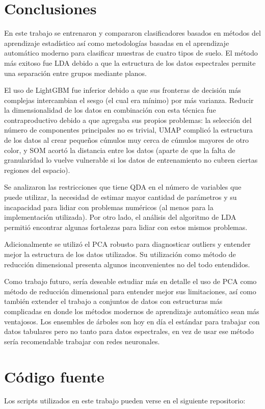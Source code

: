 \documentclass[12pt]{article}
\begin{document}
\section{Conclusiones}
En este trabajo se entrenaron y compararon clasificadores basados en métodos del aprendizaje estadístico así como metodologías basadas en el aprendizaje automático moderno para clasificar muestras de cuatro tipos de suelo. El método más exitoso fue LDA debido a que la estructura de los datos espectrales permite una separación entre grupos mediante planos.

El uso de LightGBM fue inferior debido a que sus fronteras de decisión más complejas intercambian el sesgo (el cual era mínimo) por más varianza. Reducir la dimensionalidad de los datos en combinación con esta técnica fue contraproductivo debido a que agregaba sus propios problemas: la selección del número de componentes principales no es trivial, UMAP complicó la estructura de los datos al crear pequeños cúmulos muy cerca de cúmulos mayores de otro color, y SOM acortó la distancia entre los datos (aparte de que la falta de granularidad lo vuelve vulnerable si los datos de entrenamiento no cubren ciertas regiones del espacio).

Se analizaron las restricciones que tiene QDA en el número de variables que puede utilizar, la necesidad de estimar mayor cantidad de parámetros y su incapacidad para lidiar con problemas numéricos (al menos para la implementación utilizada). Por otro lado, el análisis del algoritmo de LDA permitió encontrar algunas fortalezas para lidiar con estos mismos problemas.

Adicionalmente se utilizó el PCA robusto para diagnosticar outliers y entender mejor la estructura de los datos utilizados. Su utilización como método de reducción dimensional presenta algunos inconvenientes no del todo entendidos.

Como trabajo futuro, sería deseable estudiar más en detalle el uso de PCA como método de reducción dimensional para entender mejor sus limitaciones, así como también extender el trabajo a conjuntos de datos con estructuras más complicadas en donde los métodos modernos de aprendizaje automático sean más ventajosos. Los ensembles de árboles son hoy en día el estándar para trabajar con datos tabulares pero no tanto para datos espectrales, en vez de usar ese método sería recomendable trabajar con redes neuronales.
\section{Código fuente}
Los scripts utilizados en este trabajo pueden verse en el siguiente repositorio:
\end{document}
